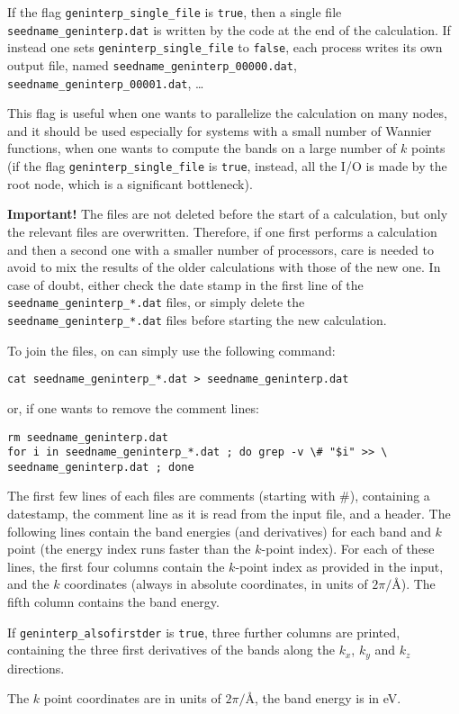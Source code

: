 If the flag \verb|geninterp_single_file| is \verb|true|, then a single
file {\tt seedname\_geninterp.dat} is written by the code at the end
of the calculation. If instead one sets \verb|geninterp_single_file|
to \verb|false|, each process writes its own output file, named 
{\tt seedname\_geninterp\_00000.dat}, {\tt
  seedname\_geninterp\_00001.dat}, \ldots

This flag is useful when one wants to parallelize the calculation on
many nodes, and it should be used especially for systems with a small
number of Wannier functions, when one wants to compute the bands on a
large number of $k$ points (if the flag \verb|geninterp_single_file|
is \verb|true|, instead, all the I/O is made by the root node, which
is a significant bottleneck).

{\bf Important!} The files are not deleted before the start of a
calculation, but only the relevant files are overwritten. Therefore,
if one first performs a calculation and then a second one with a smaller
number of processors, care is needed to avoid to mix the results of
the older calculations with those of the new one. In case of doubt,
either check the date stamp in the first line of the {\tt
    seedname\_geninterp\_*.dat} files, or simply
delete the  {\tt
    seedname\_geninterp\_*.dat} files before starting the new
  calculation.

To join the files, on can simply use the following command:
\begin{verbatim}
cat seedname_geninterp_*.dat > seedname_geninterp.dat
\end{verbatim}
or, if one wants to remove the comment lines:
\begin{verbatim}
rm seedname_geninterp.dat
for i in seedname_geninterp_*.dat ; do grep -v \# "$i" >> \
seedname_geninterp.dat ; done
\end{verbatim}


The first few lines of each files are comments (starting with \#),
containing a datestamp, the
comment line as it is read from the input file, and a header.
The following lines contain the band energies (and
derivatives) for each band and $k$ point (the energy
index runs faster than the $k$-point index).
For each of these lines, the first four columns contain the $k$-point index as provided in the
input, and the $k$ coordinates (always in absolute coordinates, in
units of $2\pi/$\AA).
The fifth column contains the band energy.

If \verb#geninterp_alsofirstder# is \verb#true#, three further columns
are printed, containing the three first derivatives of the bands along the $k_x$, $k_y$
and $k_z$ directions.

The $k$ point coordinates are in units of $2\pi/$\AA, the band energy is in eV.




